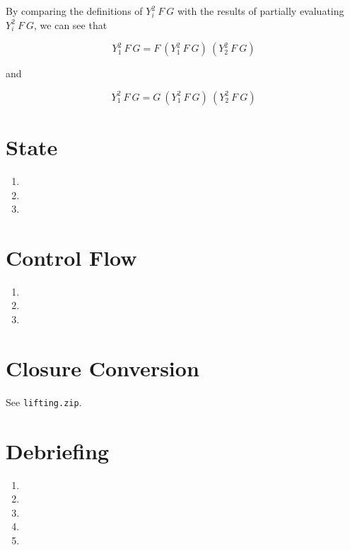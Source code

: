 \documentclass[10pt]{article}
\begin{document}
By comparing the definitions of $Y^2_i~F~G$ with the results of partially
evaluating $Y^2_i~F~G$, we can see that

$$Y^2_1~F~G = F~(Y^2_1~F~G)~(Y^2_2~F~G) $$

and

$$Y^2_1~F~G = G~(Y^2_1~F~G)~(Y^2_2~F~G) $$

\section{State}%
\begin{enumerate}
    \item
    \item
    \item
\end{enumerate}
\section{Control Flow}%
\begin{enumerate}
    \item
    \item
    \item
\end{enumerate}
\section{Closure Conversion}%
See \texttt{lifting.zip}.
\section{Debriefing}%
\begin{enumerate}
    \item
    \item
    \item
    \item
    \item
\end{enumerate}
\end{document}
